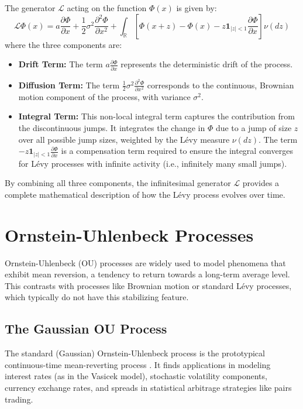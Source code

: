 \documentclass[11pt,twoside,openright]{report}
\begin{document}
The generator $\mathcal{L}$ acting on the function $\Phi(x)$ is given by:
\begin{equation}
\mathcal{L}\Phi(x) = a \frac{\partial \Phi}{\partial x} + \frac{1}{2}\sigma^2 \frac{\partial^2 \Phi}{\partial x^2} + \int_{\mathbb{R}} \left[ \Phi(x+z) - \Phi(x) - z \mathbf{1}_{|z|<1} \frac{\partial \Phi}{\partial x} \right] \nu(dz)
\label{eq:generator_definition}
\end{equation}
where the three components are:
\begin{itemize}
    \item \textbf{Drift Term:} The term $a \frac{\partial \Phi}{\partial x}$ represents the deterministic drift of the process.
    \item \textbf{Diffusion Term:} The term $\frac{1}{2}\sigma^2 \frac{\partial^2 \Phi}{\partial x^2}$ corresponds to the continuous, Brownian motion component of the process, with variance $\sigma^2$.
    \item \textbf{Integral Term:} This non-local integral term captures the contribution from the discontinuous jumps. It integrates the change in $\Phi$ due to a jump of size $z$ over all possible jump sizes, weighted by the Lévy measure $\nu(dz)$. The term $- z \mathbf{1}_{|z|<1} \frac{\partial \Phi}{\partial x}$ is a compensation term required to ensure the integral converges for Lévy processes with infinite activity (i.e., infinitely many small jumps).
\end{itemize}
By combining all three components, the infinitesimal generator $\mathcal{L}$ provides a complete mathematical description of how the Lévy process evolves over time.

\section{Ornstein-Uhlenbeck Processes}
\label{sec:ou_processes}

Ornstein-Uhlenbeck (OU) processes are widely used to model phenomena that exhibit mean reversion, a tendency to return towards a long-term average level. This contrasts with processes like Brownian motion or standard Lévy processes, which typically do not have this stabilizing feature.

\subsection{The Gaussian OU Process}
\label{subsec:gaussian_ou}

The standard (Gaussian) Ornstein-Uhlenbeck process is the prototypical continuous-time mean-reverting process \cite{karatzas1991brownian}. It finds applications in modeling interest rates (as in the Vasicek model), stochastic volatility components, currency exchange rates, and spreads in statistical arbitrage strategies like pairs trading.
\end{document}
